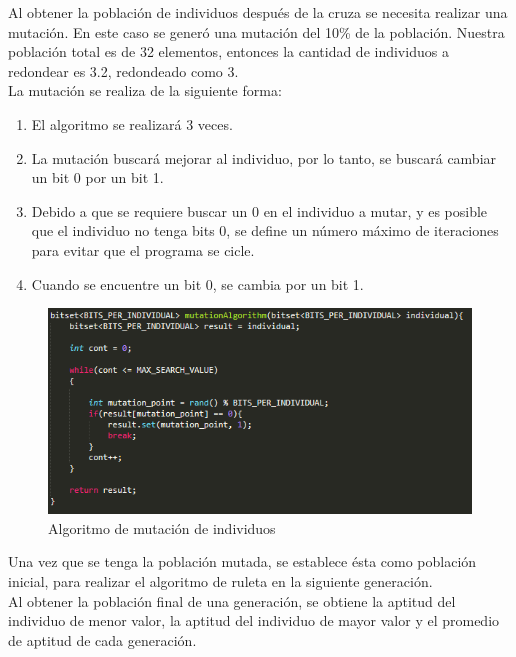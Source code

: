 \documentclass[11pt,letterpaper]{article}
\begin{document}
Al obtener la población de individuos después de la cruza se necesita realizar una mutación. En este caso se generó una mutación del 10\% de la población. Nuestra población total es de 32 elementos, entonces la cantidad de individuos a redondear es 3.2, redondeado como 3.\\

La mutación se realiza de la siguiente forma:
\begin{enumerate}
	\item El algoritmo se realizará 3 veces.
	\item La mutación buscará mejorar al individuo, por lo tanto, se buscará cambiar un bit 0 por un bit 1.
	\item Debido a que se requiere buscar un 0 en el individuo a mutar, y es posible que el individuo no tenga bits 0, se define un número máximo de iteraciones para evitar que el programa se cicle.
	\item Cuando se encuentre un bit 0, se cambia por un bit 1.
\end{enumerate}

\begin{figure}[H]
	\centering
	\includegraphics[scale = 1]{images/mutacion}
	\caption{Algoritmo de mutación de individuos}
\end{figure}

Una vez que se tenga la población mutada, se establece ésta como población inicial, para realizar el algoritmo de ruleta en la siguiente generación.\\

Al obtener la población final de una generación, se obtiene la aptitud del individuo de menor valor, la aptitud del individuo de mayor valor y el promedio de aptitud de cada generación.\\
\end{document}
